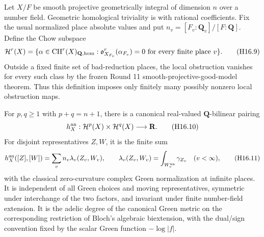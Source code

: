 Let $X/F$ be smooth projective geometrically integral of dimension $n$
over a number field. Geometric homological triviality is with rational
coefficients. Fix the usual normalized place absolute values and put
$n_v=[F_v:\mathbf Q_v]/[F:\mathbf Q]$. Define the Chow subspace
\[
 \mathcal H^r(X)=\{\alpha\in\operatorname{CH}^r(X)_{\mathbf Q,\rm hom}:
       \mathfrak o_{X_{F_v}}^r(\alpha_{F_v})=0
                    \text{ for every finite place }v\}.
 \tag{H16.9}\label{r16h:height-domain}
\]
Outside a fixed finite set of bad-reduction places, the local
obstruction vanishes for every such class by the frozen Round 11
smooth-projective-good-model theorem. Thus this definition imposes
only finitely many possibly nonzero local obstruction maps.

\begin{theorem}
\label{r16h:global-height}
For $p,q\geq1$ with $p+q=n+1$, there is a canonical real-valued
$\mathbf Q$-bilinear pairing
\[
 h_X^{\rm an}:\mathcal H^p(X)\times\mathcal H^q(X)\longrightarrow\mathbf R.
 \tag{H16.10}\label{r16h:height}
\]
For disjoint representatives $Z,W$, it is the finite sum
\[
 h_X^{\rm an}([Z],[W])
         =\sum_v n_v\lambda_v(Z_v,W_v),\qquad
 \lambda_v(Z_v,W_v)=\int_{W_v^{\rm an}}\gamma_{Z_v}\quad(v<\infty),
 \tag{H16.11}\label{r16h:height-sum}
\]
with the classical zero-curvature complex Green normalization at
infinite places. It is independent of all Green choices and moving
representatives, symmetric under interchange of the two factors, and
invariant under finite number-field extension. It is the adelic degree
of the canonical Green metric on the corresponding restriction of
Bloch's algebraic biextension, with the dual/sign convention fixed
by the scalar Green function $-\log|f|$.
\end{theorem}

